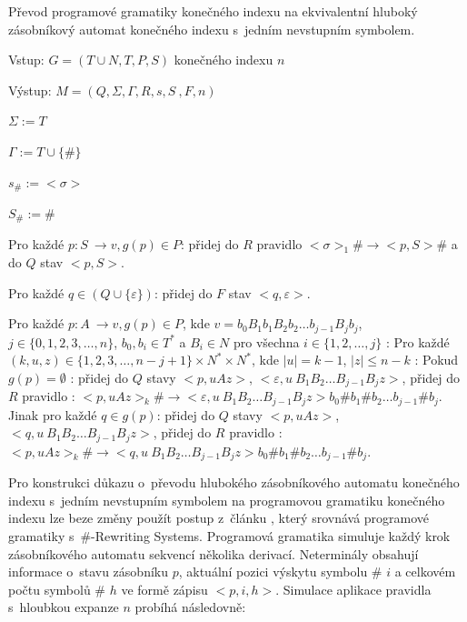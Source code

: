 \begin{Alg} \label{alg_PG}
Převod programové gramatiky konečného indexu na ekvivalentní hluboký zásobníkový automat konečného indexu s~jedním nevstupním symbolem.

\begin{list}{}{\setlength\parsep{0cm} \setlength\itemsep{0cm} \setlength\leftmargin{1em}}
  \item Vstup: $G = (T \cup N ,T,P,S)$ konečného indexu $n$
  \item Výstup: $M = (Q,\Sigma,\Gamma, R, s, S~, F, n)$ \medskip
  
  \item ${\Sigma} := T$
  \item ${\Gamma} := T \cup \{\#\}$
  \item $s_\# := <\sigma>$
  \item $S_\# := \# $ \medskip

  \item Pro každé $p: S~\rightarrow v, g(p) \in P$: 
  \subitem přidej do $R$ pravidlo $<\sigma>_1 \# \rightarrow <p, S> \#$ a do $Q$ stav $<p, S>$. \medskip

  \item Pro každé $q \in (Q \cup \{\varepsilon\})$: 
  \subitem přidej do $F$ stav $<q, \varepsilon>$. \medskip

  \item Pro každé $p: A~\rightarrow v, g(p) \in P$,  kde $v=b_0 B_1 b_1 B_2 b_2 \dots b_{j-1} B_{j} b_j$, $j \in \{0,1,2,3,\dots,n\}$, $b_0,b_i \in T^*$ a $B_i \in N$ pro všechna $i \in \{1,2,\dots,j\}$ : \medskip
  \subitem Pro každé $(k,u,z) \in \{1,2,3,\dots,n-j+1\} \times N^* \times N^*$, kde $|u| = k-1$, $|z|  \le n-k$ : \medskip
  \subsubitem Pokud $g(p) = \emptyset$ :
  \subsubitem přidej do $Q$ stavy $<p,uAz>$, $<\varepsilon, u~B_1 B_2 \dots B_{j-1} B_{j} z>$,
  \subsubitem přidej do $R$ pravidlo :
  \subsubitem $<p,uAz>_k \# \rightarrow <\varepsilon, u~B_1 B_2 \dots B_{j-1} B_{j} z> b_0 \# b_1 \# b_2 \dots b_{j-1} \# b_j$.\medskip
  \subsubitem Jinak pro každé $q \in g(p)$:
  \subsubitem přidej do $Q$ stavy $<p,uAz>$, $<q, u~B_1 B_2 \dots B_{j-1} B_{j} z>$,
  \subsubitem přidej do $R$ pravidlo :
  \subsubitem $<p,uAz>_k \# \rightarrow <q, u~B_1 B_2 \dots B_{j-1} B_{j} z> b_0 \# b_1 \# b_2 \dots b_{j-1} \# b_j$.

\end{list}
\end{Alg}



Pro konstrukci důkazu o~převodu hlubokého zásobníkového automatu konečného indexu s~jedním nevstupním symbolem na programovou gramatiku konečného indexu lze beze změny použít postup z~článku \cite{Krivka:RewritingSystems}, který srovnává programové gramatiky s~\#-Rewriting Systems. Programová gramatika simuluje každý krok zásobníkového automatu sekvencí několika derivací. Neterminály obsahují informace o~stavu zásobníku $p$, aktuální pozici výskytu symbolu \# $i$ a celkovém počtu symbolů \# $h$ ve formě zápisu $<p,i,h>$. Simulace aplikace pravidla s~hloubkou expanze $n$ probíhá následovně:

